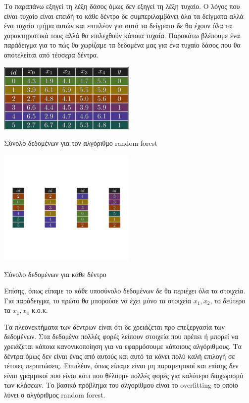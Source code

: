 Το παραπάνω εξηγεί τη λέξη δάσος όμως δεν εξηγεί τη λέξη τυχαίο. Ο λόγος που είναι τυχαίο είναι
επειδή το κάθε δέντρο δε συμπεριλαμβάνει όλα τα δείγματα αλλά ένα τυχαίο τμήμα αυτών και επιπλέον
για αυτά τα δείγματα δε θα έχουν όλα τα χαρακτηριστικά τους αλλά θα επιλεχθούν κάποια τυχαία.
Παρακάτω βλέπουμε ένα παράδειγμα για το πώς θα χωρίζαμε τα δεδομένα μας για ένα τυχαίο δάσος που
θα αποτελείται από τέσσερα δέντρα.
\begin{table}[H]
    \centering
    \includegraphics[width=0.5\textwidth]{images/random_forest.png}
    \caption{Σύνολο δεδομένων για τον αλγόριθμο \textlatin{random forest}}
\end{table}
\begin{table}[H]
    \centering
    \includegraphics[width=0.5\textwidth]{images/random_forest_split.png}
    \caption{Σύνολο δεδομένων για κάθε δέντρο}
\end{table}

Επίσης, όπως είπαμε το κάθε υποσύνολο δεδομένων δε θα περιέχει όλα τα στοιχεία. Για παράδειγμα, το
πρώτο θα μπορούσε να έχει μόνο τα στοιχεία $x_1,x_2$, το δεύτερο τα $x_1,x_4$ κ.ο.κ.

Τα πλεονεκτήματα των δέντρων είναι ότι δε χρειάζεται προ επεξεργασία των δεδομένων. Στα δεδομένα
πολλές φορές λείπουν στοιχεία που πρέπει ή μπορεί να χρειάζεται κάποια κανονικοποίηση για να
εφαρμόσουμε κάποιους αλγόριθμους. Τα δέντρα όμως δεν είναι ένας από αυτούς και αυτό τα κάνει πολύ
καλή επιλογή σε τέτοιες περιπτώσεις. Επιπλέον, όπως είπαμε είναι μη παραμετρικοί και επίσης
δεν είναι γραμμικοί που είναι κάτι που θέλουμε πολλές φορές για καλύτερο διαχωρισμό των
κλάσεων\cite{dtreeadv}.
Το βασικό πρόβλημα του αλγορίθμου είναι το \textlatin{overfitting} το οποίο λύνει ο αλγόριθμος
\textlatin{random forest}.

